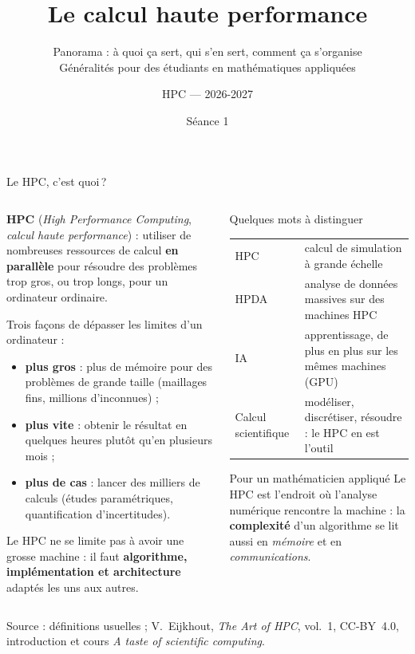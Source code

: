 \documentclass[8pt,aspectratio=169]{beamer}
\title{Le calcul haute performance}
\subtitle{Panorama : à quoi ça sert, qui s'en sert, comment ça s'organise\\
\small Généralités pour des étudiants en mathématiques appliquées}
\author{HPC --- 2026-2027}
\date{Séance 1}
\newcommand{\src}[1]{\vfill{\tiny\color{gray}Source : #1\par}}
\newcommand{\eij}{V.~Eijkhout, \emph{The Art of HPC}, vol.~1, CC-BY~4.0}
\begin{document}
\maketitle

\begin{frame}{Le HPC, c'est quoi\,?}
\begin{columns}[T]
\begin{column}{0.54\textwidth}
\textbf{HPC} (\emph{High Performance Computing}, \emph{calcul haute performance}) : utiliser de nombreuses ressources de calcul \textbf{en parallèle} pour résoudre des problèmes trop gros, ou trop longs, pour un ordinateur ordinaire.

\medskip
Trois façons de dépasser les limites d'un ordinateur :
\begin{itemize}
\item \textbf{plus gros} : plus de mémoire pour des problèmes de grande taille (maillages fins, millions d'inconnues) ;
\item \textbf{plus vite} : obtenir le résultat en quelques heures plutôt qu'en plusieurs mois ;
\item \textbf{plus de cas} : lancer des milliers de calculs (études paramétriques, quantification d'incertitudes).
\end{itemize}

\medskip
Le HPC ne se limite pas à \og avoir une grosse machine \fg{} : il faut \textbf{algorithme, implémentation et architecture} adaptés les uns aux autres.
\end{column}
\begin{column}{0.42\textwidth}
\begin{block}{Quelques mots à distinguer}
\begin{tabular}{@{}L{1.8cm}L{3.9cm}@{}}
HPC & calcul de simulation à grande échelle\\
HPDA & analyse de données massives sur des machines HPC\\
IA & apprentissage, de plus en plus sur les mêmes machines (GPU)\\
Calcul scientifique & modéliser, discrétiser, résoudre : le HPC en est l'outil\\
\end{tabular}
\end{block}
\begin{alertblock}{Pour un mathématicien appliqué}
Le HPC est l'endroit où l'analyse numérique rencontre la machine : la \textbf{complexité} d'un algorithme se lit aussi en \emph{mémoire} et en \emph{communications}.
\end{alertblock}
\end{column}
\end{columns}
\src{définitions usuelles ; \eij{}, introduction et cours \emph{A taste of scientific computing}.}
\end{frame}
\end{document}
